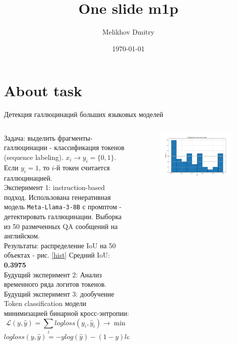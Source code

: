 \documentclass[8pt,pdf,hyperref={unicode}]{beamer}
\title[One slide m1p]{One slide m1p}
\author{Melikhov Dmitry}
\institute[]{MSU}
\date[2022]{\today}
\begin{document}


\section{About task}
\begin{frame}{Детекция галлюцинаций больших языковых моделей}
\begin{columns}
\begin{column}{0.4\textwidth}
    Задача: выделить фрагменты-галлюцинации -  классификация токенов (sequence labeling).
    $x_i \rightarrow y_i = \{0, 1\}$. Если $y_{i} = 1$, то $i$-й токен считается галлюцинацией.\\
    Эксперимент 1: instruction-based подход. Использована генеративная модель \texttt{Meta-Llama-3-8B} с промптом - детектировать галлюцинации.
    Выборка из 50 размеченных QA сообщений на английском.\\
    Результаты: распределение IoU на 50 объектах - рис. \ref{hist}
    Средний IoU: \textbf{0.3975}\\
    Будущий эксперимент 2: Анализ временного ряда логитов токенов.\\
    Будущий эксперимент 3: дообучение Token classification модели минимизацией бинарной кросс-энтропии:
    $$
    \mathcal{L}(y, \hat{y}) = \sum_{i} logloss(y_{i}, \hat{y}_{i}) \rightarrow \min
    $$
    $$
    logloss(y, \hat{y}) = - y log(\hat{y}) - (1 - y) log(1 - \hat{y})
    $$
\end{column}
\begin{column}{0.6\textwidth}
    \begin{figure}
        \centering
        \includegraphics[width=0.8\linewidth]{images/ious_histogram.pdf}

\end{figure}
\end{column}
\end{columns}
\end{frame}
\end{document}
